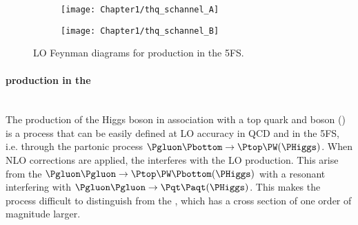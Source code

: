 \begin{figure}
\centering
\begin{subfigure}{.4\textwidth}
  \centering
  \texttt{[image: Chapter1/thq\_schannel\_A]}
  \caption{}
  \label{fig:Chap1:tH:schannel:A}
\end{subfigure}%
\begin{subfigure}{.4\textwidth}
  \centering
  \texttt{[image: Chapter1/thq\_schannel\_B]}
  \caption{}
  \label{fig:Chap1:tH:schannel:B}
\end{subfigure}%
\caption{LO Feynman diagrams for \schannel \tH production in the 5FS.}
\label{fig:Chap1:tH:schannel}
\end{figure}





\paragraph{\tH production in the \tW}\mbox{}\\
The production of the Higgs boson in association with a top quark and \PW boson
(\tWH) is a process that can be easily defined at LO accuracy in QCD and in the 5FS, i.e. 
through the partonic process $\Pgluon \Pbottom \rightarrow \Ptop \PW (\PHiggs)$\cite{Demartin:2016axk}.
When NLO corrections are applied, the \tWH interferes with the LO \ttH production.
This arise from the $\Pgluon \Pgluon  \rightarrow \Ptop \PW \Pbottom (\PHiggs)$
with a resonant \APtop interfering with $\Pgluon \Pgluon  \rightarrow \ttbar (\PHiggs)$.
This makes the \tWH process difficult to distinguish from the \ttH, which has a cross
section of one order of magnitude larger.

